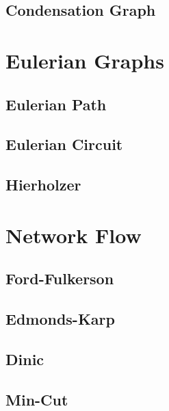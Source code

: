 \documentclass[10pt,a4paper,twocolumn]{article}
\begin{document}
\subsection{Condensation Graph}



\section{Eulerian Graphs}

\subsection{Eulerian Path}

\subsection{Eulerian Circuit}

\subsection{Hierholzer}



\section{Network Flow}

\subsection{Ford-Fulkerson}

\subsection{Edmonds-Karp}

\subsection{Dinic}

\subsection{Min-Cut}
\end{document}
